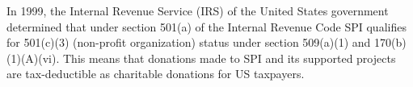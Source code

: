 \documentclass[a4paper]{report}
\begin{document}
In 1999, the Internal Revenue Service (IRS) of the United States government determined that under section 501(a) of the Internal Revenue Code SPI qualifies for 501(c)(3) (non-profit organization) status under section 509(a)(1) and 170(b)(1)(A)(vi). This means that donations made to SPI and its supported projects are tax-deductible as charitable donations for US taxpayers.

\newpage

\pagestyle{empty}


\null
\end{document}

